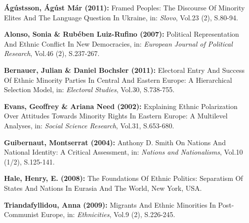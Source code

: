 \begin{compactitem}





\begin{small}



	\item [\Rectsteel] \textbf{\'{A}g\'{u}stsson, \'{A}g\'{u}st M\'{a}r (2011):} Framed Peoples: The Discourse Of Minority Elites And The Language Question In Ukraine, in: \textsl{Slovo}, Vol.23 (2), S.80-94.


	\item [\Rectsteel] \textbf{Alonso, Sonia \& Rub\'{e}ben Luiz-Rufino (2007):} Political Representation And Ethnic Conflict In New Democracies, in: \textsl{European Journal of Political Research}, Vol.46 (2), S.237-267.


	\item [\Rectsteel] \textbf{Bernauer, Julian \& Daniel Bochsler (2011):} Electoral Entry And Success Of Ethnic Minority Parties In Central And Eastern Europe: A Hierarchical Selection Model, in: \textsl{Electoral Studies}, Vol.30, S.738-755.


	\item [\Rectsteel] \textbf{Evans, Geoffrey \& Ariana Need (2002):} Explaining Ethnic Polarization Over Attitudes Towards Minority Rights In Eastern Europe: A Multilevel Analyses, in: \textsl{Social Science Research}, Vol.31, S.653-680.


	\item [\Rectsteel] \textbf{Guibernaut, Montserrat (2004):} Anthony D. Smith On Nations And National Identity: A Critical Assessment, in: \textsl{Nations and Nationalisms}, Vol.10 (1/2), S.125-141.


	\item [\Rectsteel] \textbf{Hale, Henry, E. (2008):} The Foundations Of Ethnic Politics: Separatism Of States And Nations In Eurasia And The World, New York, USA.

	\item [\Rectsteel] \textbf{Triandafyllidou, Anna (2009):} Migrants And Ethnic Minorities In Post-Communist Europe, in: \textsl{Ethnicities}, Vol.9 (2), S.226-245.


\end{small}



	\end{compactitem}
